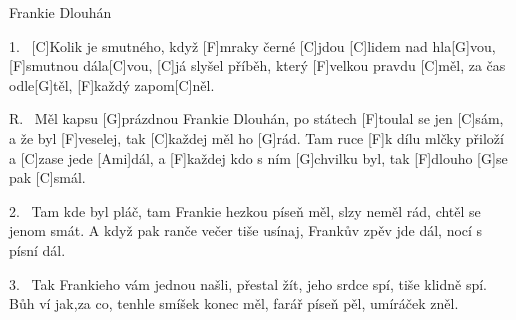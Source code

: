 \begin{song}{Frankie Dlouhán}{}

\begin{xverse}{1.~}
[C]Kolik je smutného, když [F]mraky černé [C]jdou
[C]lidem nad hla[G]vou, [F]smutnou dála[C]vou,
[C]já slyšel příběh, který [F]velkou pravdu [C]měl,
za čas odle[G]těl, [F]každý zapom[C]něl.
\end{xverse}

\begin{xverse}{R.~}
Měl kapsu [G]prázdnou Frankie Dlouhán,
po státech [F]toulal se jen [C]sám,
a že byl [F]veselej, tak [C]každej měl ho [G]rád.
Tam ruce [F]k dílu mlčky přiloží a [C]zase jede [Ami]dál,
a [F]každej kdo s ním [G]chvilku byl,
tak [F]dlouho [G]se pak [C]smál.
\end{xverse}

\begin{xverse}{2.~}
Tam kde byl pláč, tam Frankie hezkou píseň měl,
slzy neměl rád, chtěl se jenom smát.
A když pak ranče večer tiše usínaj,
Frankův zpěv jde dál, nocí s písní dál.
\end{xverse}

\begin{xverse}{3.~}
Tak Frankieho vám jednou našli, přestal žít,
jeho srdce spí, tiše klidně spí.
Bůh ví jak,za co, tenhle smíšek konec měl,
farář píseň pěl, umíráček zněl.
\end{xverse}

\end{song}

%
%
%
%
%
%
%
%
%

